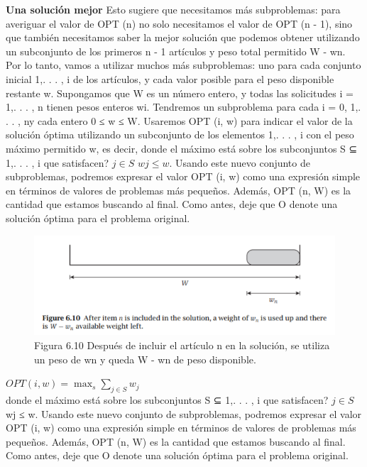 \documentclass[a4paper, 12pt]{book}
\theoremstyle{dotless}
\begin{document}
\textbf{Una solución mejor} Esto sugiere que necesitamos más subproblemas: para averiguar el valor de OPT (n) no solo necesitamos el valor de OPT (n - 1), sino que también necesitamos saber la mejor solución que podemos obtener utilizando un subconjunto de los primeros n - 1 artículos y peso total permitido W - wn. Por lo tanto, vamos a utilizar muchos más subproblemas: uno para cada conjunto inicial {1,. . . , i} de los artículos, y cada valor posible para el peso disponible restante w. Supongamos que W es un número entero, y todas las solicitudes i = 1,. . . , n tienen pesos enteros wi. Tendremos un subproblema para cada i = 0, 1,. . . , ny cada entero 0 ≤ w ≤ W. Usaremos OPT (i, w) para indicar el valor de la solución óptima utilizando un subconjunto de los elementos {1,. . . , i} con el peso máximo permitido w, es decir, donde el máximo está sobre los subconjuntos S ⊆ {1,. . . , i} que satisfacen? $j \in S$ $wj ≤ w$. Usando este nuevo conjunto de subproblemas, podremos expresar el valor OPT (i, w) como una expresión simple en términos de valores de problemas más pequeños. Además, OPT (n, W) es la cantidad que estamos buscando al final. Como antes, deje que O denote una solución óptima para el problema original.\\


\begin{figure}[h]
\centering
\includegraphics[scale=1]{Imagenes-Seccion6/fig6_10.PNG}
\caption{Figura 6.10 Después de incluir el artículo n en la solución, se utiliza un peso de wn y queda W - wn de peso disponible.}
\end{figure}

$OPT(i,w) = \max_s \sum_{j \in S} w_j$\\

donde el máximo está sobre los subconjuntos S ⊆ {1,. . . , i} que satisfacen? $j \in S$ wj ≤ w. Usando este nuevo conjunto de subproblemas, podremos expresar el valor OPT (i, w) como una expresión simple en términos de valores de problemas más pequeños. Además, OPT (n, W) es la cantidad que estamos buscando al final. Como antes, deje que O denote una solución óptima para el problema original.\\
\end{document}
